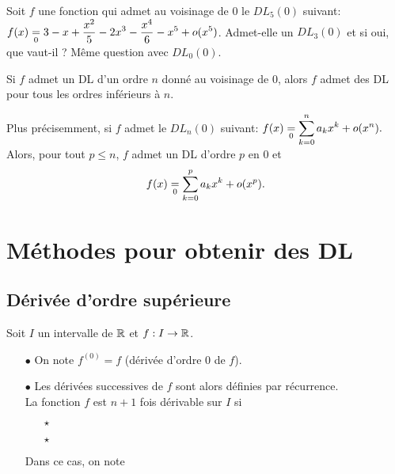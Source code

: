 \documentclass[a4paper, 11pt]{article}
\begin{document}
{\footnotesize \begin{exercice} Soit $f$ une fonction qui admet au voisinage de $0$ le $DL_5(0)$ suivant: $f(x)\underset{0}{=} 3-x+\displaystyle\frac{x^2}{5}-2x^3-\displaystyle\frac{x^4}{6}-x^5+o(x^5)$. Admet-elle un $DL_3(0)$ et si oui, que vaut-il ? M\^{e}me question avec $DL_0(0)$. 
\end{exercice}

\begin{prop} 

Si $f$ admet un DL d'un ordre $n$ donn\'e au voisinage de 0, alors $f$ admet des DL pour tous les ordres inférieurs à $n$.

Plus pr\'ecisemment, si $f$ admet le $DL_n(0)$ suivant: $f(x)\underset{0}{=}\displaystyle\sum\limits_{k=0}^n a_kx^k+o(x^n).$ Alors, pour tout $p\leq n$,  $f$ admet un DL d'ordre $p$ en $0$ et  
$$f(x)\underset{0}{=}\displaystyle\sum\limits_{k=0}^p a_kx^k+o(x^p).$$


\end{prop}
 



\section{M\'ethodes pour obtenir des DL}

\subsection{Dérivée d'ordre supérieure}


\begin{defi}
Soit $I$ un intervalle de $\mathbb{R}$ et $f: I\rightarrow \mathbb{R}$.
\begin{itemize}
\item[$\bullet$] On note $f^{(0)}=f$ (d\'eriv\'ee d'ordre 0 de $f$). 
\item[$\bullet$] Les d\'eriv\'ees successives de $f$ sont alors d\'efinies par r\'ecurrence.\\
\noindent La fonction $f$ est $n+1$ fois d\'erivable sur $I$ si \vsec
\begin{itemize}
\item[$\star$]  \dotfill \vsec
\item[$\star$] \dotfill \vsec
\end{itemize}
Dans ce cas, on note \dotfill \vsec
\end{itemize}
\end{defi}
 

}
\end{document}
